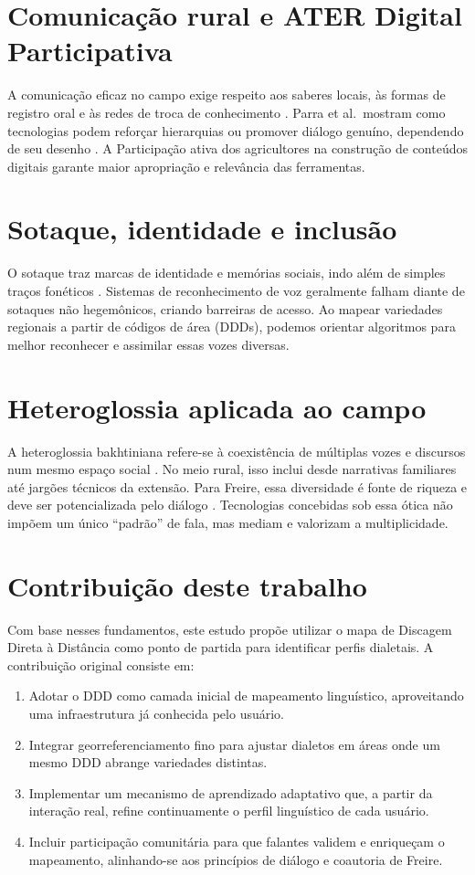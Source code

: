 \section{Comunicação rural e ATER Digital Participativa}
A comunicação eficaz no campo exige respeito aos saberes locais, às formas de registro oral e às redes de troca de conhecimento \cite{zuin2021comunicacao}. Parra et al.\ mostram como tecnologias podem reforçar hierarquias ou promover diálogo genuíno, dependendo de seu desenho \cite{parra2021asbraer}. A Participação ativa dos agricultores na construção de conteúdos digitais garante maior apropriação e relevância das ferramentas.

\section{Sotaque, identidade e inclusão}
O sotaque traz marcas de identidade e memórias sociais, indo além de simples traços fonéticos \cite{bakhtin2021marxismo, bakhtin2006}. Sistemas de reconhecimento de voz geralmente falham diante de sotaques não hegemônicos, criando barreiras de acesso. Ao mapear variedades regionais a partir de códigos de área (DDDs), podemos orientar algoritmos para melhor reconhecer e assimilar essas vozes diversas.

\section{Heteroglossia aplicada ao campo}
A heteroglossia bakhtiniana refere-se à coexistência de múltiplas vozes e discursos num mesmo espaço social \cite{faraco2009}. No meio rural, isso inclui desde narrativas familiares até jargões técnicos da extensão. Para Freire, essa diversidade é fonte de riqueza e deve ser potencializada pelo diálogo \cite{freire2013extensao}. Tecnologias concebidas sob essa ótica não impõem um único “padrão” de fala, mas mediam e valorizam a multiplicidade.

\section{Contribuição deste trabalho}
Com base nesses fundamentos, este estudo propõe utilizar o mapa de Discagem Direta à Distância como ponto de partida para identificar perfis dialetais. A contribuição original consiste em:

\begin{enumerate}
  \item Adotar o DDD como camada inicial de mapeamento linguístico, aproveitando uma infraestrutura já conhecida pelo usuário.
  \item Integrar georreferenciamento fino para ajustar dialetos em áreas onde um mesmo DDD abrange variedades distintas.
  \item Implementar um mecanismo de aprendizado adaptativo que, a partir da interação real, refine continuamente o perfil linguístico de cada usuário.
  \item Incluir participação comunitária para que falantes validem e enriqueçam o mapeamento, alinhando-se aos princípios de diálogo e coautoria de Freire.
\end{enumerate}

